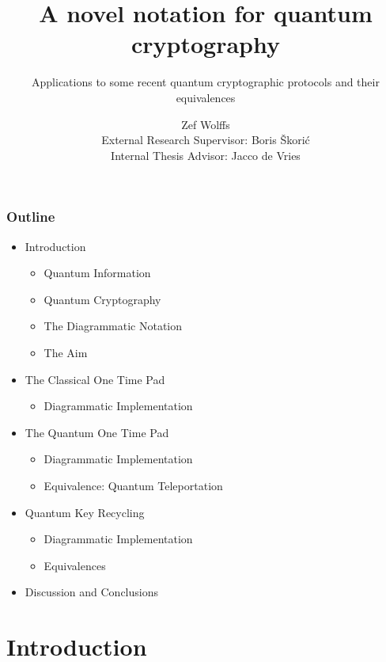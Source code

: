 \documentclass[]{beamer}
\title{A novel notation for quantum cryptography}
\subtitle{Applications to some recent quantum cryptographic protocols and their equivalences}
\author{Zef Wolffs \\ External Research Supervisor: Boris Škorić \\ Internal Thesis Advisor: Jacco de Vries }
\begin{document}
\maketitle

\begin{frame}
\frametitle{Outline}

\begin{itemize}

\item Introduction
	\begin{itemize}
		\item Quantum Information
		\item Quantum Cryptography
		\item The Diagrammatic Notation
		\item The Aim
	\end{itemize}

\item The Classical One Time Pad
	\begin{itemize}
		\item Diagrammatic Implementation
	\end{itemize}

\item The Quantum One Time Pad
	\begin{itemize}
		\item Diagrammatic Implementation
		\item Equivalence: Quantum Teleportation
	\end{itemize}

\item Quantum Key Recycling
	\begin{itemize}
		\item Diagrammatic Implementation
		\item Equivalences
	\end{itemize}

\item Discussion and Conclusions

\end{itemize}
\end{frame}

\section{Introduction}

\begin{frame}
	\centering 
	\Huge
\end{frame}
\end{document}
